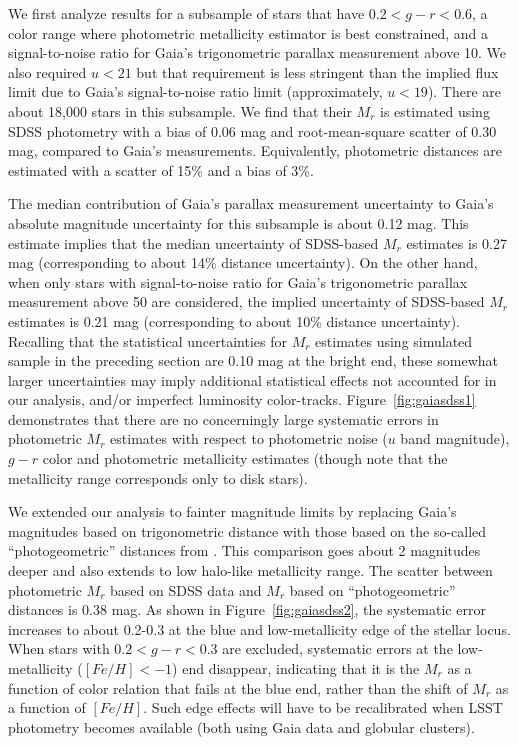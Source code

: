 We first analyze results for a subsample of stars that have $0.2 < g − r < 0.6$, a color range where photometric metallicity estimator is best constrained,
and a signal-to-noise ratio for Gaia's trigonometric
parallax measurement above 10.  We also required $u<21$ but that requirement is less stringent than the implied flux limit due to
Gaia's signal-to-noise ratio limit (approximately, $u<19$). There are about 18,000 stars in this subsample.
We find that their $M_r$ is estimated using SDSS photometry with a bias of 0.06 mag and root-mean-square scatter of 0.30 mag, compared
to Gaia's measurements. Equivalently, photometric distances  are estimated with a scatter of 15\% and a bias of 3\%.

The median contribution of Gaia's parallax measurement uncertainty to Gaia's absolute
magnitude uncertainty for this subsample is about 0.12 mag. This estimate implies that the median uncertainty of SDSS-based $M_r$
estimates is 0.27 mag (corresponding to about 14\% distance uncertainty). On the other hand, when only stars with signal-to-noise
ratio for Gaia's trigonometric parallax measurement above 50 are considered, the implied uncertainty of SDSS-based $M_r$
estimates is 0.21 mag (corresponding to about 10\% distance uncertainty).  Recalling that the statistical uncertainties for $M_r$
estimates using simulated sample in the preceding section are 0.10 mag at the bright end, these somewhat larger uncertainties may
imply additional statistical effects not accounted for in our analysis, and/or imperfect luminosity color-tracks.
Figure~\ref{fig:gaiasdss1} demonstrates that there are no concerningly large systematic errors in photometric $M_r$ estimates with
respect to photometric noise ($u$ band magnitude), $g-r$ color and photometric metallicity estimates (though note that the metallicity
range corresponds only to disk stars).

We extended our analysis to fainter magnitude limits by replacing Gaia's magnitudes based on trigonometric distance with those based on
the so-called ``photogeometric'' distances from \cite{bailer-jones_estimating_2021}. This comparison goes about 2
magnitudes deeper and also extends to low halo-like metallicity range. The scatter between photometric $M_r$ based on SDSS data and
$M_r$ based on ``photogeometric'' distances is 0.38 mag. As shown in Figure~\ref{fig:gaiasdss2}, the systematic error
increases to about 0.2-0.3 at the blue and low-metallicity edge of the stellar locus. When stars with $0.2 < g-r < 0.3$ are excluded,
systematic errors at the low-metallicity ($[Fe/H]<-1$) end disappear, indicating that it is the $M_r$ as a function of color relation that fails at the blue end,
rather than the shift of $M_r$ as a function of $[Fe/H]$. Such edge effects will have to be recalibrated when LSST photometry becomes available
(both using Gaia data and globular clusters). 




